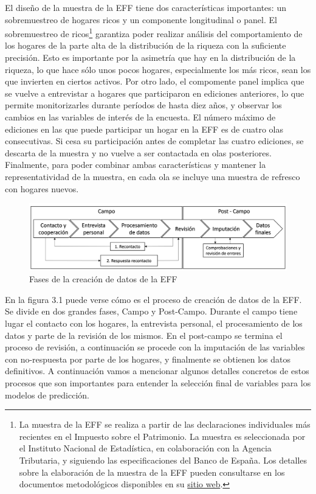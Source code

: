 El diseño de la muestra de la EFF tiene dos características importantes: un sobremuestreo de hogares ricos y un componente longitudinal o panel. El sobremuestreo de ricos\footnote{La muestra de la EFF se realiza a partir de las declaraciones individuales más recientes en el Impuesto sobre el Patrimonio. La muestra es seleccionada por el Instituto Nacional de Estadística, en colaboración con la Agencia Tributaria, y siguiendo las especificaciones del Banco de España. Los detalles sobre la elaboración de la muestra de la EFF pueden consultarse en los documentos metodológicos disponibles en su \href{https://app.bde.es/efs_www/home?lang=ES}{sitio web}.} garantiza poder realizar análisis del comportamiento de los hogares de la parte alta de la distribución de la riqueza con la suficiente precisión. Esto es importante por la asimetría que hay en la distribución de la riqueza, lo que hace sólo unos pocos hogares, especialmente los más ricos, sean los que invierten en ciertos activos. Por otro lado, el compomente panel implica que se vuelve a entrevistar a hogares que participaron en ediciones anteriores, lo que permite monitorizarles durante períodos de hasta diez años, y observar los cambios en las variables de interés de la encuesta. El número máximo de ediciones en las que puede participar un hogar en la EFF es de cuatro olas consecutivas. Si cesa su participación antes de completar las cuatro ediciones, se descarta de la muestra y no vuelve a ser contactada en olas posteriores. Finalmente, para poder combinar ambas características y mantener la representatividad de la muestra, en cada ola se incluye una muestra de refresco con hogares nuevos.

\begin{figure}
	\centering
	\includegraphics[width=1\textwidth]{figs/fases_creacion_datos_eff.png}
	\caption{Fases de la creación de datos de la EFF}
	\label{fig:eff_phases}
\end{figure}

En la figura 3.1 puede verse cómo es el proceso de creación de datos de la EFF. Se divide en dos grandes fases, Campo y Post-Campo. Durante el campo tiene lugar el contacto con los hogares, la entrevista personal, el procesamiento de los datos y parte de la revisión de los mismos. En el post-campo se termina el proceso de revisión, a continuación se procede con la imputación de las variables con no-respuesta por parte de los hogares, y finalmente se obtienen los datos definitivos. A continuación vamos a mencionar algunos detalles concretos de estos procesos que son importantes para entender la selección final de variables para los modelos de predicción.

